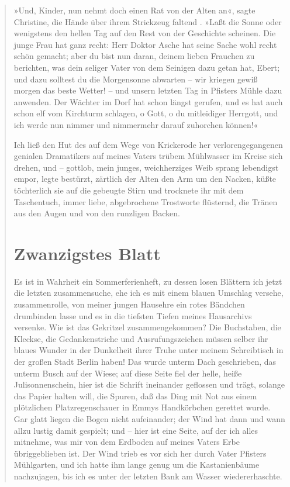 \begin{verse}
»Und, Kinder, nun nehmt doch einen Rat von der Alten an«, sagte
Christine, die Hände über ihrem Strickzeug faltend . »Laßt die
Sonne oder wenigstens den hellen Tag auf den Rest von der
Geschichte scheinen. Die junge Frau hat ganz recht: Herr Doktor
Asche hat seine Sache wohl recht schön gemacht; aber du bist nun
daran, deinem lieben Frauchen zu berichten, was dein seliger Vater
von dem Seinigen dazu getan hat, Ebert; und dazu solltest du die
Morgensonne abwarten – wir kriegen gewiß morgen das beste Wetter! –
und unsern letzten Tag in Pfisters Mühle dazu anwenden. Der Wächter
im Dorf hat schon längst gerufen, und es hat auch schon elf vom
Kirchturm schlagen, o Gott, o du mitleidiger Herrgott, und ich
werde nun nimmer und nimmermehr darauf zuhorchen können!«

Ich ließ den Hut des auf dem Wege von Krickerode her
verlorengegangenen genialen Dramatikers auf meines Vaters trübem
Mühlwasser im Kreise sich drehen, und – gottlob, mein junges,
weichherziges Weib sprang lebendigst empor, legte bestürzt,
zärtlich der Alten den Arm um den Nacken, küßte töchterlich sie auf
die gebeugte Stirn und trocknete ihr mit dem Taschentuch, immer
liebe, abgebrochene Trostworte flüsternd, die Tränen aus den Augen
und von den runzligen Backen.

\section{Zwanzigstes Blatt}

Es ist in Wahrheit ein Sommerferienheft, zu dessen losen Blättern
ich jetzt die letzten zusammensuche, ehe ich es mit einem blauen
Umschlag versehe, zusammenrolle, von meiner jungen Hausehre ein
rotes Bändchen drumbinden lasse und es in die tiefsten Tiefen
meines Hausarchivs versenke. Wie ist das Gekritzel
zusammengekommen? Die Buchstaben, die Kleckse, die Gedankenstriche
und Ausrufungszeichen müssen selber ihr blaues Wunder in der
Dunkelheit ihrer Truhe unter meinem Schreibtisch in der großen
Stadt Berlin haben! Das wurde unterm Dach geschrieben, das unterm
Busch auf der Wiese; auf diese Seite fiel der helle, heiße
Julisonnenschein, hier ist die Schrift ineinander geflossen und
trägt, solange das Papier halten will, die Spuren, daß das Ding mit
Not aus einem plötzlichen Platzregenschauer in Emmys Handkörbchen
gerettet wurde. Gar glatt liegen die Bogen nicht aufeinander; der
Wind hat dann und wann allzu lustig damit gespielt; und – hier ist
eine Seite, auf der ich alles mitnehme, was mir von dem Erdboden
auf meines Vaters Erbe übriggeblieben ist. Der Wind trieb es vor
sich her durch Vater Pfisters Mühlgarten, und ich hatte ihm lange
genug um die Kastanienbäume nachzujagen, bis ich es unter der
letzten Bank am Wasser wiedererhaschte.


\end{verse}

